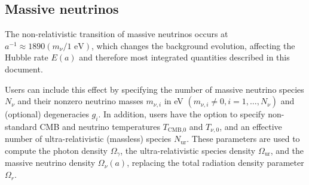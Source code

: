 
\subsection{Massive neutrinos}

The non-relativistic transition of massive neutrinos occurs at $a^{-1}\approx 1890 (m_\nu/1\text{ eV})$, which changes the background evolution, affecting the Hubble rate $E(a)$ and therefore most integrated quantities described in this document.

Users can include this effect by specifying the number of massive neutrino species $N_\nu$ and their nonzero neutrino masses $m_{\nu,i}$ in eV $(m_{\nu,i}\neq 0, i=1,\dots,N_\nu)$ and (optional) degeneracies $g_i$. In addition, users have the option to specify non-standard CMB and neutrino temperatures $T_\text{CMB,0}$ and $T_{\nu,0}$, and an effective number of ultra-relativistic (massless) species $N_\mathrm{ur}$. These parameters are used to compute the photon density $\Omega_\gamma$, the ultra-relativistic species density $\Omega_\mathrm{ur}$, and the massive neutrino density $\Omega_\nu(a)$, replacing the total radiation density parameter $\Omega_r$.

